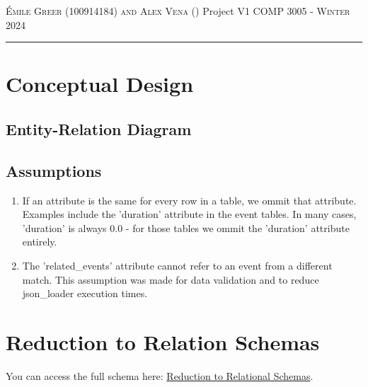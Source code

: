 \documentclass[12pt]{article}
\begin{document}
\thispagestyle{empty}

{\scshape Émile Greer (100914184) and Alex Vena ()} \hfill {Project V1 \scshape \large} \hfill {\scshape COMP 3005 - Winter 2024}
 
\smallskip
\hrule
\bigskip

\section*{Conceptual Design}
\subsection*{Entity-Relation Diagram}

\subsection*{Assumptions}
\begin{enumerate}
    \item If an attribute is the same for every row in a table, we ommit that attribute. Examples include the 'duration' attribute in the event tables. In many cases, 'duration' is always 0.0 - for those tables we ommit the 'duration' attribute entirely.
    \item The 'related\_events' attribute cannot refer to an event from a different match. This assumption was made for data validation and to reduce json\_loader execution times.
\end{enumerate}

\section*{Reduction to Relation Schemas}
You can access the full schema here: \href{https://dbdiagram.io/d/soccer_schema-66196f2f03593b6b61de1763}{Reduction to Relational Schemas}.
\end{document}
